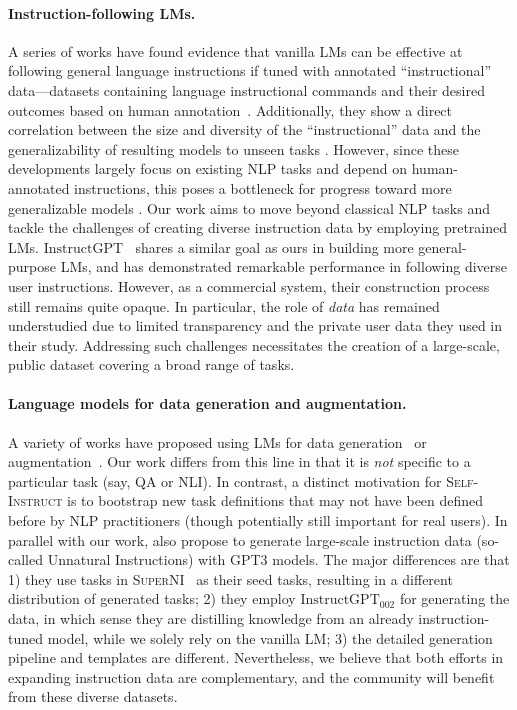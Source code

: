 \documentclass[11pt]{article}
\newcommand{\name}{\textsc{Self-Instruct}}
\newcommand{\supernatShort}{\textsc{SuperNI}}
\newcommand{\gptinstruct}[1]{$\text{InstructGPT}_{\text{#1}}$}
\begin{document}
\paragraph{Instruction-following LMs.}
A series of works have found evidence that vanilla LMs can be effective at following general language instructions if tuned with annotated ``instructional'' data---datasets containing language instructional commands and their desired outcomes based on human annotation~\cite[i.a.]{weller2020learning, mishra2022cross,wei2022finetuned,sanh2022multitask}. 
Additionally, they show a direct correlation between the size and diversity of the ``instructional'' data and the generalizability of resulting models to unseen tasks \citep{wang2022benchmarking,chung2022scaling}. 
However, since these developments largely focus on existing NLP tasks and depend on human-annotated instructions, this poses a bottleneck for progress toward more generalizable models 
\cite[e.g., see Fig.~5a in][]{wang2022benchmarking}. 
Our work aims to move beyond classical NLP tasks and tackle the challenges of creating diverse instruction data by employing pretrained LMs.
\gptinstruct{}~\cite{ouyang2022training} shares a similar goal as ours in building more general-purpose LMs, and has demonstrated remarkable performance in following diverse user instructions. However, as a commercial system, their construction process still remains quite opaque. In particular, the role of \emph{data} has remained understudied due to limited transparency and the private user data they used in their study.
Addressing such challenges necessitates the creation of a large-scale, public dataset covering a broad range of tasks.

\paragraph{Language models for data generation and augmentation.}
A variety of works have proposed using LMs for data generation~\cite{schick2021generating,wang2021towards,liu2022wanli,meng2022tuning} or augmentation~\cite{feng2021survey,yang2020generative,mekala2022intermediate}.
Our work differs from this line in that it is \emph{not} specific to a particular task (say, QA or NLI). In contrast, a distinct motivation for \name{} is to bootstrap new task definitions that may not have been defined before by NLP practitioners (though potentially still important for real users).  In parallel with our work, \citet{honovich2022unnatural} also propose to generate large-scale instruction data (so-called Unnatural Instructions) with GPT3 models. The major differences are that 1) they use tasks in \supernatShort{}~\citep{wang2022benchmarking} as their seed tasks, resulting in a different distribution of generated tasks; 2) they employ \gptinstruct{002} for generating the data, in which sense they are distilling knowledge from an already instruction-tuned model, while we solely rely on the vanilla LM; 3) the detailed generation pipeline and templates are different. Nevertheless, we believe that both efforts in expanding instruction data are complementary, and the community will benefit from these diverse datasets.
\end{document}
